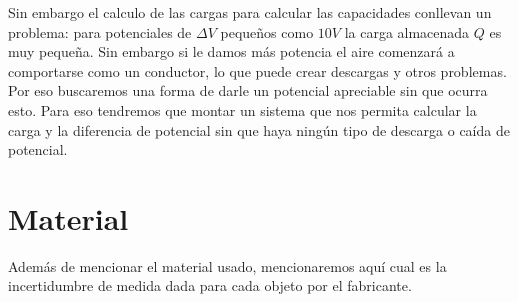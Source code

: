 \documentclass[12pt,a4paper]{article}
\begin{document}
Sin embargo el calculo de las cargas para calcular las capacidades conllevan un problema: para potenciales de $\Delta V$ pequeños como $10 V$ la carga almacenada $Q$ es muy pequeña. Sin embargo si le damos más potencia el aire comenzará a comportarse como un conductor, lo que puede crear descargas y otros problemas. Por eso buscaremos una forma de darle un potencial apreciable sin que ocurra esto. Para eso tendremos que montar un sistema que nos permita calcular la carga y la diferencia de potencial sin que haya ningún tipo de descarga o caída de potencial. 


\section{Material}

Además de mencionar el material usado, mencionaremos aquí cual es la incertidumbre de medida dada para cada objeto por el fabricante.
\end{document}
